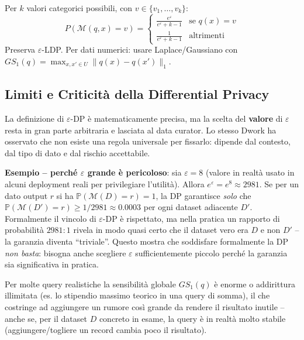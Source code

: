 \documentclass[a4paper,11pt]{article}
\begin{document}
\begin{definizione}
Per $k$ valori categorici possibili, con $v \in \{v_1, \ldots, v_k\}$:
\[
P(\mathcal{M}(q, x) = v) = \begin{cases} \frac{e^\varepsilon}{e^\varepsilon + k - 1} & \text{se } q(x) = v \\ \frac{1}{e^\varepsilon + k - 1} & \text{altrimenti} \end{cases}
\]
Preserva $\varepsilon$-LDP. Per dati numerici: usare Laplace/Gaussiano con $GS_1(q) = \max_{x, x' \in U} \|q(x) - q(x')\|_1$.
\end{definizione}

\subsection{Limiti e Criticit\`{a} della Differential Privacy}

\begin{nota}
La definizione di $\varepsilon$-DP \`{e} matematicamente precisa, ma la scelta del \textbf{valore} di $\varepsilon$ resta in gran parte arbitraria e lasciata al data curator. Lo stesso Dwork ha osservato che non esiste una regola universale per fissarlo: dipende dal contesto, dal tipo di dato e dal rischio accettabile.

\textbf{Esempio -- perch\'{e} $\varepsilon$ grande \`{e} pericoloso}: sia $\varepsilon = 8$ (valore in realt\`{a} usato in alcuni deployment reali per privilegiare l'utilit\`{a}). Allora $e^{\varepsilon} = e^8 \approx 2981$. Se per un dato output $r$ si ha $\mathbb{P}(\mathcal{M}(D)=r)=1$, la DP garantisce \emph{solo} che $\mathbb{P}(\mathcal{M}(D')=r) \geq 1/2981 \approx 0.0003$ per ogni dataset adiacente $D'$. Formalmente il vincolo di $\varepsilon$-DP \`{e} rispettato, ma nella pratica un rapporto di probabilit\`{a} $2981{:}1$ rivela in modo quasi certo che il dataset vero era $D$ e non $D'$ -- la garanzia diventa ``triviale''. Questo mostra che soddisfare formalmente la DP \emph{non basta}: bisogna anche scegliere $\varepsilon$ sufficientemente piccolo perch\'{e} la garanzia sia significativa in pratica.
\end{nota}

\begin{nota}
Per molte query realistiche la sensibilit\`{a} globale $GS_1(q)$ \`{e} enorme o addirittura illimitata (es. lo stipendio massimo teorico in una query di somma), il che costringe ad aggiungere un rumore cos\`{i} grande da rendere il risultato inutile -- anche se, per il dataset $D$ concreto in esame, la query \`{e} in realt\`{a} molto stabile (aggiungere/togliere un record cambia poco il risultato).
\end{nota}
\end{document}
